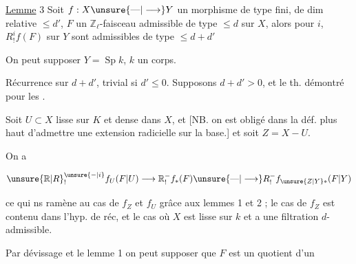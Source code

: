 
\uline{Lemme} 3 \quad Soit $f:X\unsure{\text{---}|\longrightarrow}Y$ un morphisme  de type fini, de dim relative $\leq d'$, $F$ un $\mathbb Z_\ell$-faisceau admissible de type $\leq d$ sur $X$, alors pour  $i$, $R^i_!f(F)$ sur $Y$ sont admissibles de type $\leq d+d'$

\margin{$\Big\downarrow$}

On peut supposer $Y=\operatorname{Sp}k$, $k$ un corps.

Récurrence sur $d+d'$, trivial si $d'\leq0$. Supposons $d+d'>0$, et le th. démontré pour les  .

Soit $U\subset X$  lisse sur $K$ et dense dans $X$, et  [NB. on est obligé dans la déf. plus haut d'admettre une extension radicielle sur la base.] et soit $Z=X-U$.

On a

\[ \unsure{\mathbb R|R}^{\unsure{-|i}}_! f_U(F|U)\longrightarrow \mathbb R^{-}_!f_*(F)\unsure{\text{---}|\longrightarrow}R^{-}_!f_{\unsure{Z|Y}*}(F|Y) \]

ce qui ns ramène au cas de $f_Z$ et $f_U$ grâce aux lemmes 1 et 2 ; le cas de $f_Z$ est contenu dans l'hyp. de réc, et   le cas  où $X$ est lisse sur $k$ et a une filtration $d$-admissible.

Par dévissage et le lemme 1  on peut supposer que $F$ est un quotient  d'un

